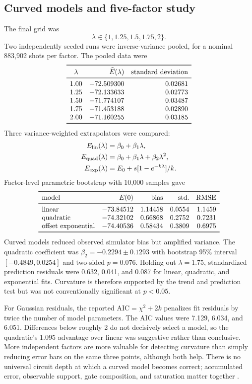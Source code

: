 \documentclass[11pt]{article}
\begin{document}
\subsection{Curved models and five-factor study}

The final grid was
\[
 \lambda\in\{1,1.25,1.5,1.75,2\}.
\]
Two independently seeded runs were inverse-variance pooled, for a nominal
883,902 shots per factor.  The pooled data were
\[
\begin{array}{crr}
\toprule
\lambda&\widehat E(\lambda)&\text{standard deviation}\\
\midrule
1.00&-72.509300&0.02681\\
1.25&-72.133633&0.02773\\
1.50&-71.774107&0.03487\\
1.75&-71.453188&0.02890\\
2.00&-71.160255&0.03185\\
\bottomrule
\end{array}
\]
Three variance-weighted extrapolators were compared:
\begin{align}
 E_{\rm lin}(\lambda)&=\beta_0+\beta_1\lambda,\\
 E_{\rm quad}(\lambda)&=\beta_0+\beta_1\lambda+\beta_2\lambda^2,\\
 E_{\rm exp}(\lambda)&=E_0+s[1-e^{-k\lambda}]/k.
\end{align}
Factor-level parametric bootstrap with 10,000 samples gave
\[
\begin{array}{lrrrr}
\toprule
\text{model}&E(0)&\text{bias}&\text{std.}&\text{RMSE}\\
\midrule
\text{linear}&-73.84512&1.14458&0.0554&1.1459\\
\text{quadratic}&-74.32102&0.66868&0.2752&0.7231\\
\text{offset exponential}&-74.40536&0.58434&0.3809&0.6975\\
\bottomrule
\end{array}
\]
Curved models reduced observed simulator bias but amplified variance.  The
quadratic coefficient was $\beta_2=-0.2294\pm0.1293$ with bootstrap 95\%
interval $[-0.4849,0.0254]$ and two-sided $p=0.076$.  Holding out
$\lambda=1.75$, standardized prediction residuals were 0.632, 0.041, and
0.087 for linear, quadratic, and exponential fits.  Curvature is therefore
supported by the trend and prediction test but was not conventionally
significant at $p<0.05$.

For Gaussian residuals, the reported
$\mathrm{AIC}=\chi^2+2k$ penalizes fit residuals by twice the number of model
parameters.  The AIC values were 7.129, 6.034, and 6.051.  Differences below
roughly 2 do not decisively select a model, so the quadratic's 1.095 advantage
over linear was suggestive rather than conclusive.  More independent factors
are more valuable for detecting curvature than simply reducing error bars on
the same three points, although both help.  There is no universal circuit
depth at which a curved model becomes correct; accumulated error, observable
support, gate composition, and saturation matter together
\cite{majumdar2023,cai2021}.
\end{document}
